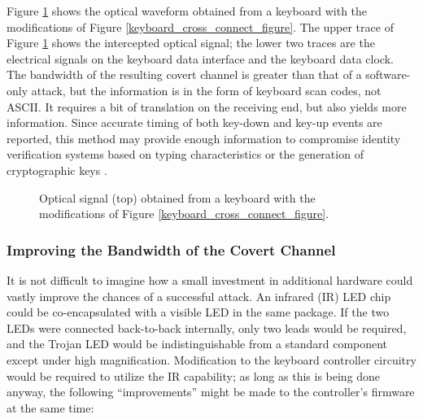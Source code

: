 \documentclass{acmtrans2e}
\begin{document}
Figure \ref{keyboard_intercept_figure} shows the optical waveform 
obtained from a keyboard with the modifications of Figure 
\ref{keyboard_cross_connect_figure}.  The upper trace of
Figure \ref{keyboard_intercept_figure} shows the
intercepted optical signal; the lower two traces are the electrical
signals on the keyboard data interface and the keyboard data clock.
The bandwidth of the resulting 
covert channel is greater than that of a software-only attack, but the 
information is in the form of keyboard scan codes, not ASCII.  It 
requires a bit of translation on the receiving end, but also yields more 
information.  Since accurate timing of both key-down and key-up events 
are reported, this method may provide enough information to compromise 
identity verification systems based on typing characteristics
\cite{umphress_and_williams} or the
generation of cryptographic keys \cite{pgp}.

\begin{figure}
\centering
\caption{Optical signal (top) obtained from a keyboard with the 
modifications of Figure \ref{keyboard_cross_connect_figure}.}
\label{keyboard_intercept_figure}
\end{figure}

\subsubsection{Improving the Bandwidth of the Covert Channel}

It is not difficult to imagine how a small investment in additional 
hardware could vastly improve the chances of a successful attack.  An 
infrared (IR) LED chip could be co-encapsulated with a visible LED in 
the same package.  If the two LEDs were connected back-to-back 
internally, only two leads would be required, and the Trojan LED would 
be indistinguishable from a standard component except under high 
magnification.  Modification to the keyboard controller circuitry would 
be required to utilize the IR capability; as long as this is being done 
anyway, the following ``improvements'' might be made to the controller's 
firmware at the same time:
\end{document}
